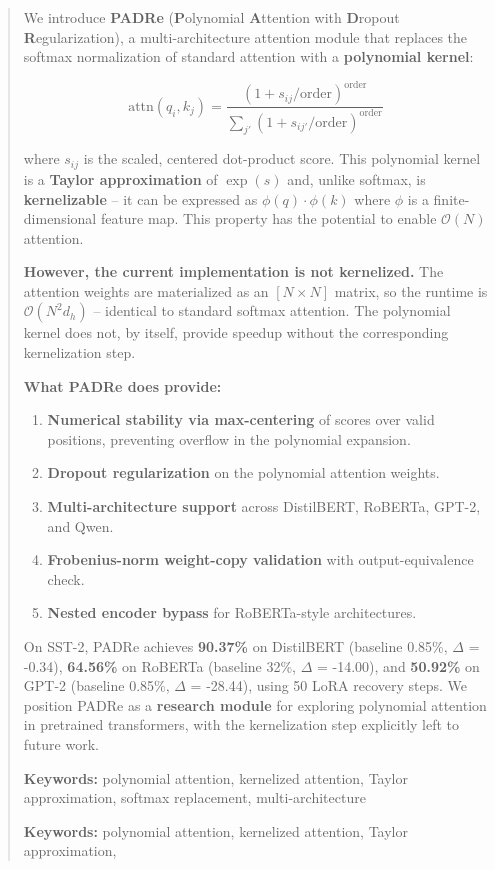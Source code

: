 \documentclass[10pt,twocolumn,letterpaper]{article}
\begin{document}
\maketitle

\begin{abstract}
We introduce \textbf{PADRe} (\textbf{P}olynomial \textbf{A}ttention with \textbf{D}ropout \textbf{R}egularization), 
a multi-architecture attention module that replaces the softmax normalization 
of standard attention with a \textbf{polynomial kernel}:

\[
\text{attn}(q_i, k_j) = \frac{(1 + s_{ij}/\text{order})^\text{order}}{\sum_{j'} (1 + s_{ij'}/\text{order})^\text{order}}
\]

where $s_{ij}$ is the scaled, centered dot-product score. This polynomial 
kernel is a \textbf{Taylor approximation} of $\exp(s)$ and, unlike softmax, is 
\textbf{kernelizable} -- it can be expressed as $\phi(q) \cdot \phi(k)$ where $\phi$ 
is a finite-dimensional feature map. This property has the potential to enable 
$\mathcal{O}(N)$ attention.

\textbf{However, the current implementation is not kernelized.} The attention 
weights are materialized as an $[N \times N]$ matrix, so the runtime is 
$\mathcal{O}(N^2 d_h)$ -- identical to standard softmax attention. The 
polynomial kernel does not, by itself, provide speedup without the 
corresponding kernelization step.

\textbf{What PADRe does provide:}

\begin{enumerate}
\item \textbf{Numerical stability via max-centering} of scores over valid positions,
  preventing overflow in the polynomial expansion.
\item \textbf{Dropout regularization} on the polynomial attention weights.
\item \textbf{Multi-architecture support} across DistilBERT, RoBERTa, GPT-2, and Qwen.
\item \textbf{Frobenius-norm weight-copy validation} with output-equivalence check.
\item \textbf{Nested encoder bypass} for RoBERTa-style architectures.

\end{enumerate}
On SST-2, PADRe achieves \textbf{90.37\%} on DistilBERT (baseline 0.85\%, 
$\Delta$ = -0.34), \textbf{64.56\%} on RoBERTa (baseline 32\%, 
$\Delta$ = -14.00), and \textbf{50.92\%} on GPT-2 (baseline 0.85\%, 
$\Delta$ = -28.44), using 50 LoRA recovery steps. We 
position PADRe as a \textbf{research module} for exploring polynomial attention 
in pretrained transformers, with the kernelization step explicitly left to 
future work.

\textbf{Keywords:} polynomial attention, kernelized attention, Taylor approximation, 
softmax replacement, multi-architecture



\vspace{0.5em}
\noindent\textbf{Keywords:} polynomial attention, kernelized attention, Taylor approximation,
\end{abstract}
\end{document}
